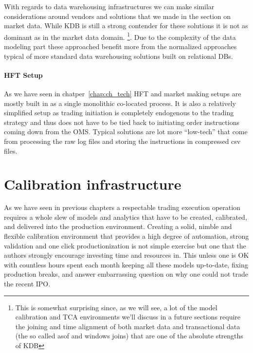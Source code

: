 With regards to data warehousing infrastructures we can make similar considerations around vendors and solutions that we made in the section on market data. While KDB is still a strong contender for these solutions it is not as dominant as in the market data domain. \footnote{This is somewhat surprising since, as we will see, a lot of the model calibration and TCA environments we'll discuss in a future sections require the joining and time alignment of both market data and transactional data (the so called asof and windows joins) that are one of the absolute strengths of KDB}. Due to the  complexity of the data modeling part these approached benefit more from the normalized approaches typical of more standard data warehousing solutions built on relational DBs. 

\paragraph{HFT Setup}
As we have seen in chatper~\ref{chap:ch_tech} HFT and market making setups are mostly built in as a single monolithic co-located process. It is also a relatively simplified setup as trading initiation is completely endogenous to the trading strategy and thus does not have to be tied back to initiating order instructions coming down from the OMS. Typical solutions are  lot more ``low-tech'' that come from processing the raw log files and storing the instructions in compressed csv files.

\section{Calibration infrastructure}
As we have seen in previous chapters a respectable trading execution operation requires a whole slew of models and analytics that have to be created, calibrated, and delivered into the production environment. Creating a solid, nimble and flexible calibration environment that provides a high degree of automation, strong validation and one click productionization is not  simple exercise but one that the authors strongly encourage investing time and resources in. This unless one is OK with countless hours spent each month keeping all these models up-to-date, fixing production breaks, and answer embarrassing question on why one could not trade the recent IPO. 

